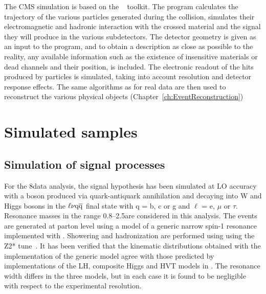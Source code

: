 The CMS simulation is based on the \GEANTfour~\cite{Agostinelli:2002hh} toolkit.
The program calculates the trajectory of the various particles generated during the collision, simulates their electromagnetic and hadronic interaction with the crossed material and the signal they will produce in the various subdetectors.
The detector geometry is given as an input to the program, and to obtain a description as close as possible to the reality, any available information such as the existence of insensitive materials or dead channels and their position, is included.
The electronic readout of the hits produced by particles is simulated, taking into account resolution and detector response effects.
The same algorithms as for real data are then used to reconstruct the various physical objects (Chapter~\ref{ch:EventReconstruction})

\section{Simulated samples}\label{sec:MCsamples}

\subsection{Simulation of signal processes}\label{subsec:signalMC}

For the 8\TeV data analysis, the signal hypothesis has been simulated at LO accuracy with a \Wpr boson produced via quark-antiquark annihilation and decaying into W and Higgs bosons
in the $\ell\nu\mathrm{q}\overline{\mathrm{q}}$ final state with q = b, c or g and $\ell$ = e, $\mu$ or $\tau$. Resonance masses in the range 0.8--2.5\TeV are considered in this analysis.
The events are generated at parton level using a model of a generic narrow spin-1 \Wpr resonance implemented with \MADGRAPH{}.
Showering and hadronization are performed using  using the Z2* tune~\cite{Chatrchyan:2011id,Chatrchyan:2013gfi}.
It has been verified that the kinematic distributions obtained with the implementation of the generic model 
agree with those predicted by implementations of the LH, composite Higgs and HVT models in \MADGRAPH{}.
The resonance width differs in the three models, but in each case it is found to be negligible with respect to the experimental resolution.

